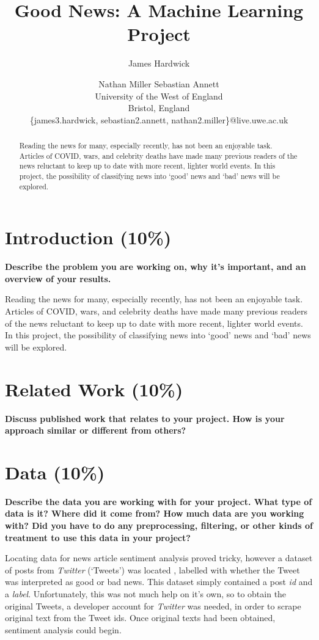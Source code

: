 \documentclass{article}
\title{Good News: A Machine Learning Project}
\author{
James Hardwick\and
Nathan Miller\And
Sebastian Annett\\
\affiliations
University of the West of England\\
Bristol, England\\
\emails
\{james3.hardwick, sebastian2.annett, nathan2.miller\}@live.uwe.ac.uk
}
\begin{document}
\maketitle

\begin{abstract}
    Reading the news for many, especially recently, has not been an enjoyable task. Articles of COVID, wars, and celebrity deaths have made many previous readers of the news reluctant to keep up to date with more recent, lighter world events. In this project, the possibility of classifying news into `good' news and `bad' news will be explored.
\end{abstract}

\section{Introduction (10\%)}

\textbf{Describe the problem you are working on, why it's important, and an overview of your results.}

Reading the news for many, especially recently, has not been an enjoyable task. Articles of COVID, wars, and celebrity deaths have made many previous readers of the news reluctant to keep up to date with more recent, lighter world events. In this project, the possibility of classifying news into `good' news and `bad' news will be explored.

\section{Related Work (10\%)}

\textbf{Discuss published work that relates to your project. How is your approach similar or different from others?}

\section{Data (10\%)}

\textbf{Describe the data you are working with for your project. What type of data is it? Where did it come from? How much data are you working with? Did you have to do any preprocessing, filtering, or other kinds of treatment to use this data in your project?}

Locating data for news article sentiment analysis proved tricky, however a dataset of posts from {\it Twitter} (`Tweets') was located \cite{goodBadNewsTweetDataset}, labelled with whether the Tweet was interpreted as good or bad news. This dataset simply contained a post {\it id} and a {\it label}. Unfortunately, this was not much help on it's own, so to obtain the original Tweets, a developer account for {\it Twitter} was needed, in order to scrape original text from the Tweet ids. Once original texts had been obtained, sentiment analysis could begin.
\end{document}
